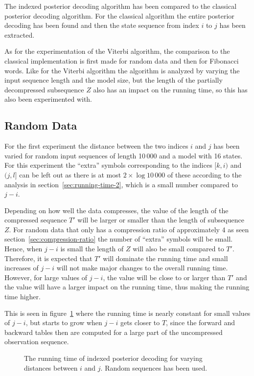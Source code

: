 The indexed posterior decoding algorithm has been compared to the classical
posterior decoding algorithm. For the classical algorithm the entire posterior
decoding has been found and then the state sequence from index $i$ to $j$ has
been extracted.

As for the experimentation of the Viterbi algorithm, the comparison to the
classical implementation is first made for random data and then for Fibonacci
words. Like for the Viterbi algorithm the algorithm is analyzed by varying the
input sequence length and the model size, but the length of the partially
decompressed subsequence $Z$ also has an impact on the running time, so this
has also been experimented with.

\subsection{Random Data}

For the first experiment the distance between the two indices $i$ and $j$ has
been varied for random input sequences of length 10\,000 and a model with 16
states. For this experiment the ``extra'' symbols corresponding to the indices
$[k, i)$ and $(j, l]$ can be left out as there is at most $2 \times \log 10\,000$
of these according to the analysis in section~\ref{sec:running-time-2}, which
is a small number compared to $j - i$.

Depending on how well the data compresses, the value of the length of the
compressed sequence $T'$ will be larger or smaller than the length of
subsequence $Z$. For random data that only has a compression ratio of
approximately 4 as seen section~\ref{sec:compression-ratio} the number of
``extra'' symbols will be small. Hence, when $j - i$ is small the length of $Z$
will also be small compared to $T'$. Therefore, it is expected that $T'$ will
dominate the running time and small increases of $j - i$ will not make major
changes to the overall running time. However, for large values of $j - i$, the
value will be close to or larger than $T'$ and the value will have a larger
impact on the running time, thus making the running time higher.

This is seen in
figure~\ref{fig:assymptotic_indexed_posterior_subseq_length.tex} where the
running time is nearly constant for small values of $j - i$, but starts to grow
when $j - i$ gets closer to $T$, since the forward and backward tables then are
computed for a large part of the uncompressed observation sequence.

\begin{figure}
  \centering
  
  \caption{The running time of indexed posterior decoding for varying distances
    between $i$ and $j$. Random sequences has been used.}
  \label{fig:assymptotic_indexed_posterior_subseq_length.tex}
\end{figure}

